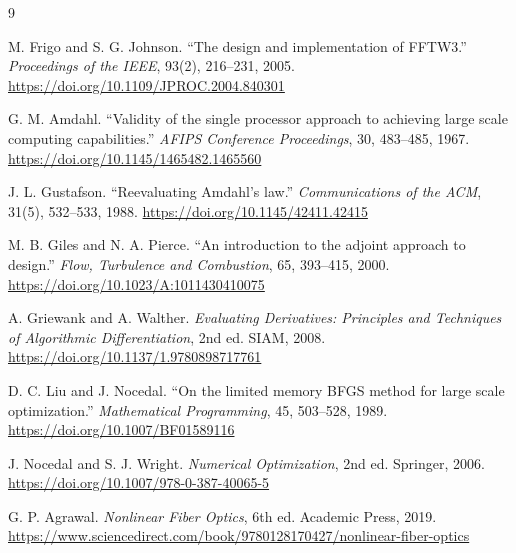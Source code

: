 \documentclass[11pt]{article}
\begin{document}
\begin{thebibliography}{9}

M. Frigo and S. G. Johnson.
``The design and implementation of FFTW3.''
\textit{Proceedings of the IEEE}, 93(2), 216--231, 2005.
\url{https://doi.org/10.1109/JPROC.2004.840301}

G. M. Amdahl.
``Validity of the single processor approach to achieving large scale computing
capabilities.''
\textit{AFIPS Conference Proceedings}, 30, 483--485, 1967.
\url{https://doi.org/10.1145/1465482.1465560}

J. L. Gustafson.
``Reevaluating Amdahl's law.''
\textit{Communications of the ACM}, 31(5), 532--533, 1988.
\url{https://doi.org/10.1145/42411.42415}

M. B. Giles and N. A. Pierce.
``An introduction to the adjoint approach to design.''
\textit{Flow, Turbulence and Combustion}, 65, 393--415, 2000.
\url{https://doi.org/10.1023/A:1011430410075}

A. Griewank and A. Walther.
\textit{Evaluating Derivatives: Principles and Techniques of Algorithmic
Differentiation}, 2nd ed.
SIAM, 2008.
\url{https://doi.org/10.1137/1.9780898717761}

D. C. Liu and J. Nocedal.
``On the limited memory BFGS method for large scale optimization.''
\textit{Mathematical Programming}, 45, 503--528, 1989.
\url{https://doi.org/10.1007/BF01589116}

J. Nocedal and S. J. Wright.
\textit{Numerical Optimization}, 2nd ed.
Springer, 2006.
\url{https://doi.org/10.1007/978-0-387-40065-5}

G. P. Agrawal.
\textit{Nonlinear Fiber Optics}, 6th ed.
Academic Press, 2019.
\url{https://www.sciencedirect.com/book/9780128170427/nonlinear-fiber-optics}

\end{thebibliography}
\end{document}
